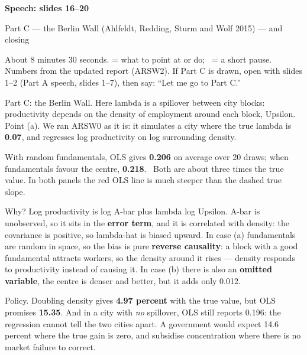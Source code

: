 \newcommand{\speechpart}{Part C and closing, slides 16--20}


{\color{unicablue}\Huge\bfseries Speech: slides 16--20\par}
\vspace{2pt}
{\Large Part C --- the Berlin Wall (Ahlfeldt, Redding, Sturm and Wolf 2015) --- and closing\par}
\vspace{4pt}
{\small About 8 minutes 30 seconds.  = what to point at or do; \pause\ = a short pause. Numbers from the updated report (ARSW2). If Part C is drawn, open with slides 1--2 (Part A speech, slides 1--7), then say: ``Let me go to Part C.''}

\begin{say}
 Part C: the Berlin Wall. Here lambda is a spillover between city blocks: productivity depends on the density of employment around each block, Upsilon. Point (a). We ran ARSW0 as it is: it simulates a city where the true lambda is \textbf{0.07}, and regresses log productivity on log surrounding density.

 With random fundamentals, OLS gives \textbf{0.206} on average over 20 draws; when fundamentals favour the centre, \textbf{0.218}. \pause\ Both are about three times the true value.  In both panels the red OLS line is much steeper than the dashed true slope.

 Why? Log productivity is log A-bar plus lambda log Upsilon. A-bar is unobserved, so it sits in the \textbf{error term}, and it is correlated with density: the covariance is positive, so lambda-hat is biased upward.  In case (a) fundamentals are random in space, so the bias is pure \textbf{reverse causality}: a block with a good fundamental attracts workers, so the density around it rises --- density responds to productivity instead of causing it. In case (b) there is also an \textbf{omitted variable}, the centre is denser and better, but it adds only 0.012.

 Policy. Doubling density gives \textbf{4.97 percent} with the true value, but OLS promises \textbf{15.35}.  And in a city with \emph{no} spillover, OLS still reports 0.196: the regression cannot tell the two cities apart. A government would expect 14.6 percent where the true gain is zero, and subsidise concentration where there is no market failure to correct.
\end{say}

